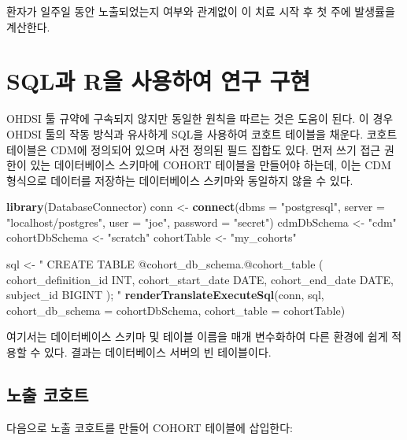 \documentclass[11pt]{book}
\newenvironment{Shaded}{\begin{snugshade}}{\end{snugshade}}
\newcommand{\KeywordTok}[1]{\textcolor[rgb]{0.13,0.29,0.53}{\textbf{#1}}}
\newcommand{\DataTypeTok}[1]{\textcolor[rgb]{0.13,0.29,0.53}{#1}}
\newcommand{\StringTok}[1]{\textcolor[rgb]{0.31,0.60,0.02}{#1}}
\newcommand{\NormalTok}[1]{#1}
\theoremstyle{definition}
\theoremstyle{definition}
\theoremstyle{definition}
\theoremstyle{remark}
\begin{document}
환자가 일주일 동안 노출되었는지 여부와 관계없이 이 치료 시작 후 첫 주에
발생률을 계산한다.

\section{SQL과 R을 사용하여 연구 구현}\label{sql-r---}

OHDSI 툴 규약에 구속되지 않지만 동일한 원칙을 따르는 것은 도움이 된다.
이 경우 OHDSI 툴의 작동 방식과 유사하게 SQL을 사용하여 코호트 테이블을
채운다. 코호트 테이블은 CDM에 정의되어 있으며 사전 정의된 필드 집합도
있다. 먼저 쓰기 접근 권한이 있는 데이터베이스 스키마에 COHORT 테이블을
만들어야 하는데, 이는 CDM 형식으로 데이터를 저장하는 데이터베이스
스키마와 동일하지 않을 수 있다.

\begin{Shaded}
\begin{Highlighting}[]
\KeywordTok{library}\NormalTok{(DatabaseConnector)}
\NormalTok{conn <-}\StringTok{ }\KeywordTok{connect}\NormalTok{(}\DataTypeTok{dbms =} \StringTok{"postgresql"}\NormalTok{,}
                \DataTypeTok{server =} \StringTok{"localhost/postgres"}\NormalTok{,}
                \DataTypeTok{user =} \StringTok{"joe"}\NormalTok{,}
                \DataTypeTok{password =} \StringTok{"secret"}\NormalTok{)}
\NormalTok{cdmDbSchema <-}\StringTok{ "cdm"}
\NormalTok{cohortDbSchema <-}\StringTok{ "scratch"}
\NormalTok{cohortTable <-}\StringTok{ "my_cohorts"}

\NormalTok{sql <-}\StringTok{ "}
\StringTok{CREATE TABLE @cohort_db_schema.@cohort_table (}
\StringTok{  cohort_definition_id INT,}
\StringTok{  cohort_start_date DATE,}
\StringTok{  cohort_end_date DATE,}
\StringTok{  subject_id BIGINT}
\StringTok{);}
\StringTok{"}
\KeywordTok{renderTranslateExecuteSql}\NormalTok{(conn, sql,}
                          \DataTypeTok{cohort_db_schema =}\NormalTok{ cohortDbSchema,}
                          \DataTypeTok{cohort_table =}\NormalTok{ cohortTable)}
\end{Highlighting}
\end{Shaded}

여기서는 데이터베이스 스키마 및 테이블 이름을 매개 변수화하여 다른
환경에 쉽게 적용할 수 있다. 결과는 데이터베이스 서버의 빈 테이블이다.

\subsection{노출 코호트}\label{-}

다음으로 노출 코호트를 만들어 COHORT 테이블에 삽입한다:
\end{document}
